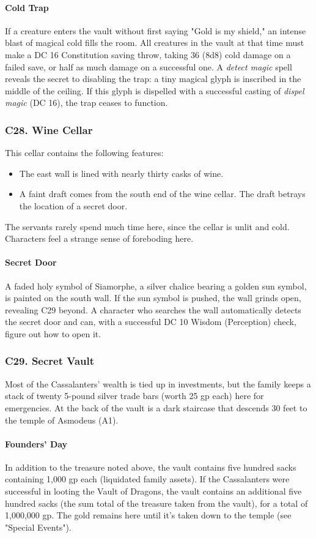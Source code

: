 \documentclass[10pt,a4paper,twoside,twocolumn,openany,nodeprecatedcode]{dndbook}
\begin{document}
\paragraph{Cold Trap}
If a creature enters the vault without first saying "Gold is my shield," an intense blast of magical cold fills the room. All creatures in the vault at that time must make a DC 16 Constitution saving throw, taking 36 (8d8) cold damage on a failed save, or half as much damage on a successful one.
A \textit{detect magic} spell reveals the secret to disabling the trap: a tiny magical glyph is inscribed in the middle of the ceiling. If this glyph is dispelled with a successful casting of \textit{dispel magic} (DC 16), the trap ceases to function.
\subsubsection{C28. Wine Cellar}
This cellar contains the following features:
\begin{itemize}

\item The east wall is lined with nearly thirty casks of wine.
\item A faint draft comes from the south end of the wine cellar. The draft betrays the location of a secret door.
\end{itemize}


The servants rarely spend much time here, since the cellar is unlit and cold. Characters feel a strange sense of foreboding here.
\paragraph{Secret Door}
A faded holy symbol of Siamorphe, a silver chalice bearing a golden sun symbol, is painted on the south wall. If the sun symbol is pushed, the wall grinds open, revealing C29 beyond. A character who searches the wall automatically detects the secret door and can, with a successful DC 10 Wisdom (Perception) check, figure out how to open it.
\subsubsection{C29. Secret Vault}
Most of the Cassalanters' wealth is tied up in investments, but the family keeps a stack of twenty 5-pound silver trade bars (worth 25 gp each) here for emergencies. At the back of the vault is a dark staircase that descends 30 feet to the temple of Asmodeus (A1).
\paragraph{Founders' Day}
In addition to the treasure noted above, the vault contains five hundred sacks containing 1,000 gp each (liquidated family assets). If the Cassalanters were successful in looting the Vault of Dragons, the vault contains an additional five hundred sacks (the sum total of the treasure taken from the vault), for a total of 1,000,000 gp. The gold remains here until it's taken down to the temple (see "Special Events").
\end{document}
